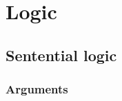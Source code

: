 \documentclass{book}
\begin{document}
\maketitle
\tableofcontents
	\part{Logic}
		\chapter{Sentential logic}
			\section{Arguments}
			
\end{document}
